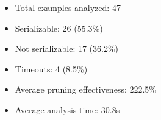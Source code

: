 \begin{itemize}
\item Total examples analyzed: 47
\item Serializable: 26 (55.3\%)
\item Not serializable: 17 (36.2\%)
\item Timeouts: 4 (8.5\%)
\item Average pruning effectiveness: 222.5\%
\item Average analysis time: 30.8s
\end{itemize}
